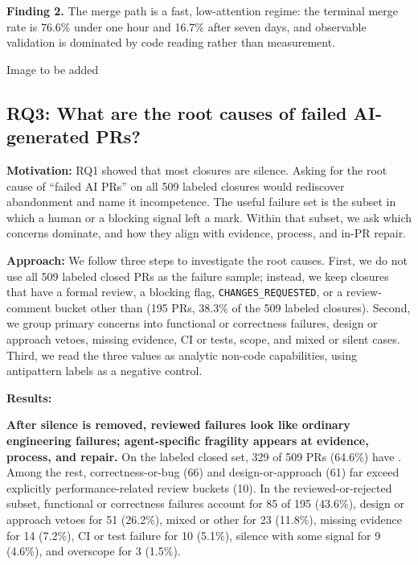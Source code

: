 \begin{center}
\begin{tcolorbox}
\textbf{Finding 2.} The merge path is a fast, low-attention regime: the terminal merge rate is 76.6\% under one hour and 16.7\% after seven days, and observable validation is dominated by code reading rather than measurement.
\end{tcolorbox}
\end{center}

{\color{red}Image to be added}

\subsection{RQ3: What are the root causes of failed AI-generated PRs?}
\label{RQ3}

\noindent\textbf{Motivation:} RQ1 showed that most closures are silence. Asking for the root cause of “failed AI PRs” on all 509 labeled closures would rediscover abandonment and name it incompetence. The useful failure set is the subset in which a human or a blocking signal left a mark. Within that subset, we ask which concerns dominate, and how they align with evidence, process, and in-PR repair.

\noindent\textbf{Approach:} We follow three steps to investigate the root causes. First, we do not use all 509 labeled closed PRs as the failure sample; instead, we keep closures that have a formal review, a blocking flag, \texttt{CHANGES\_REQUESTED}, or a review-comment bucket other than  (195 PRs, 38.3\% of the 509 labeled closures). Second, we group primary concerns into functional or correctness failures, design or approach vetoes, missing evidence, CI or tests, scope, and mixed or silent cases. Third, we read the three  values as analytic non-code capabilities, using antipattern labels as a negative control.

\noindent\textbf{Results:} 

\textbf{After silence is removed, reviewed failures look like ordinary engineering failures; agent-specific fragility appears at evidence, process, and repair.} On the labeled closed set, 329 of 509 PRs (64.6\%) have . Among the rest, correctness-or-bug (66) and design-or-approach (61) far exceed explicitly performance-related review buckets (10). In the reviewed-or-rejected subset, functional or correctness failures account for 85 of 195 (43.6\%), design or approach vetoes for 51 (26.2\%), mixed or other for 23 (11.8\%), missing evidence for 14 (7.2\%), CI or test failure for 10 (5.1\%), silence with some signal for 9 (4.6\%), and overscope for 3 (1.5\%).

